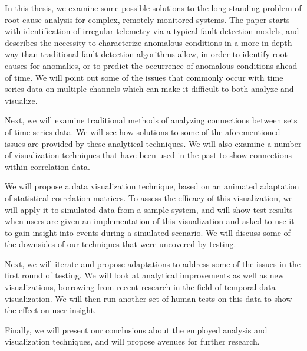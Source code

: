 In this thesis, we examine some possible solutions to the long-standing problem of root cause analysis for complex, remotely monitored systems. The paper starts with identification of irregular telemetry via a typical fault detection models, and describes the necessity to characterize anomalous conditions in a more in-depth way than traditional fault detection algorithms allow, in order to identify root causes for anomalies, or to predict the occurrence of anomalous conditions ahead of time. We will point out some of the issues that commonly occur with time series data on multiple channels which can make it difficult to both analyze and visualize.

Next, we will examine traditional methods of analyzing connections between sets of time series data. We will see how solutions to some of the aforementioned issues are provided by these analytical techniques. We will also examine a number of visualization techniques that have been used in the past to show connections within correlation data.

We will propose a data visualization technique, based on an animated adaptation of statistical correlation matrices. To assess the efficacy of this visualization, we will apply it to simulated data from a sample system, and will show test results when users are given an implementation of this visualization and asked to use it to gain insight into events during a simulated scenario. We will discuss some of the downsides of our techniques that were uncovered by testing.

Next, we will iterate and propose adaptations to address some of the issues in the first round of testing. We will look at analytical improvements as well as new visualizations, borrowing from recent research in the field of temporal data visualization. We will then run another set of human tests on this data to show the effect on user insight.

Finally, we will present our conclusions about the employed analysis and visualization techniques, and will propose avenues for further research.